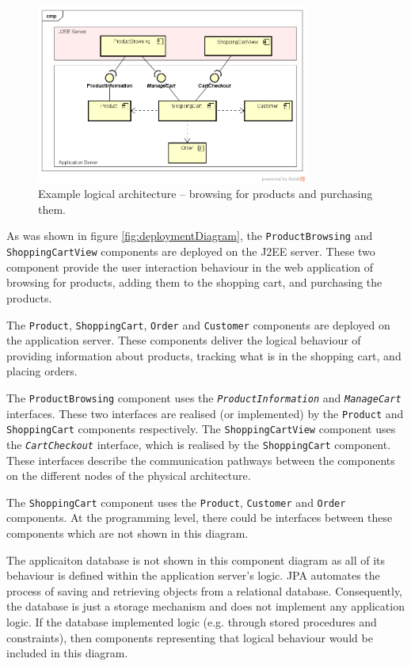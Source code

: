 \begin{figure}[h]
    \centering
    \includegraphics[trim=39 37 22 49,clip,width=0.8\textwidth]{images/uml/component_diagram.png}
    \caption{Example logical architecture -- browsing for products and purchasing them.}
    \label{fig:componentDiagram}
\end{figure}

As was shown in figure \ref{fig:deploymentDiagram},
the \texttt{ProductBrowsing} and \texttt{ShoppingCartView} components are deployed on the J2EE server.
These two component provide the user interaction behaviour in the web application
of browsing for products, adding them to the shopping cart, and purchasing the products.

The \texttt{Product}, \texttt{ShoppingCart}, \texttt{Order} and \texttt{Customer} components are deployed on the application server.
These components deliver the logical behaviour of providing information about products, tracking what is in the shopping cart, and placing orders.

The \texttt{ProductBrowsing} component uses the \texttt{\textsl{ProductInformation}} and \texttt{\textsl{ManageCart}} interfaces.
These two interfaces are realised (or implemented) by the \texttt{Product} and \texttt{ShoppingCart} components respectively.
The \texttt{ShoppingCartView} component uses the \texttt{\textsl{CartCheckout}} interface, which is realised by the \texttt{ShoppingCart} component.
These interfaces describe the communication pathways between the components on the different nodes of the physical architecture.

The \texttt{ShoppingCart} component uses the \texttt{Product}, \texttt{Customer} and \texttt{Order} components.
At the programming level, there could be interfaces between these components which are not shown in this diagram.

\noindent
The applicaiton database is not shown in this component diagram as all of its behaviour is defined within the application server's logic.
JPA automates the process of saving and retrieving objects from a relational database.
Consequently, the database is just a storage mechanism and does not implement any application logic.
If the database implemented logic (e.g. through stored procedures and constraints),
then components representing that logical behaviour would be included in this diagram.

